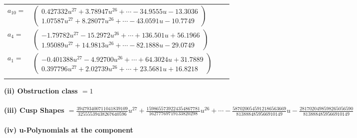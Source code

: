 \documentclass[1p]{elsarticle_modified}
\theoremstyle{definition}
\begin{document}
\begin{tabular}{m{7pt} m{180pt} m{7pt} m{180pt} }
\flushright $a_{10}=$&$\begin{pmatrix}0.427332 u^{27}+3.78947 u^{26}+\cdots-34.9555 u-13.3036\\1.07587 u^{27}+8.28077 u^{26}+\cdots-43.0591 u-10.7749\end{pmatrix}$ \\
\flushright $a_{4}=$&$\begin{pmatrix}-1.79782 u^{27}-15.2972 u^{26}+\cdots+136.501 u+56.1966\\1.95089 u^{27}+14.9813 u^{26}+\cdots-82.1888 u-29.0749\end{pmatrix}$ \\
\flushright $a_{1}=$&$\begin{pmatrix}-0.401388 u^{27}-4.92700 u^{26}+\cdots+64.3024 u+31.7889\\0.397796 u^{27}+2.02739 u^{26}+\cdots+23.5681 u+16.8218\end{pmatrix}$\\&\end{tabular}
\flushleft \textbf{(ii) Obstruction class $= 1$}\\~\\
\flushleft \textbf{(iii) Cusp Shapes $= \frac{394793400711041839109}{32555539438267640596} u^{27}+\frac{1598655739224354867781}{16277769719133820298} u^{26}+\cdots-\frac{5870200545912186563669}{8138884859566910149} u-\frac{2817020498598265056590}{8138884859566910149}$}\\~\\
\newpage\renewcommand{\arraystretch}{1}
\flushleft \textbf{(iv) u-Polynomials at the component}\newline \\
\end{document}
